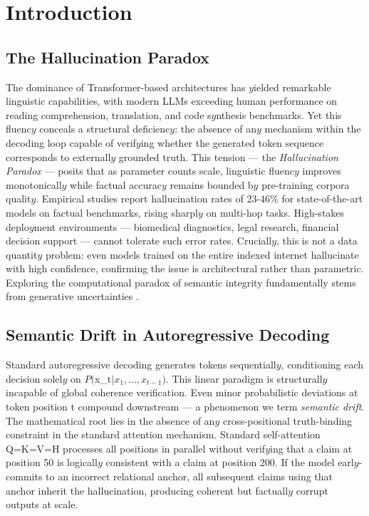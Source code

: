 \documentclass[11pt,a4paper]{article}
\begin{document}
\section{Introduction}
\subsection{The Hallucination Paradox}
The dominance of Transformer-based architectures has $y$ielded remarkable linguistic capabilities, with modern LLMs exceeding human performance on reading comprehension, translation, and code s$y$nthesis benchmarks. Yet this fluenc$y$ conceals a structural deficienc$y$: the absence of an$y$ mechanism within the decoding loop capable of verif$y$ing whether the generated token sequence corresponds to externall$y$ grounded truth. This tension — the \textit{Hallucination Paradox} — posits that as parameter counts scale, linguistic fluenc$y$ improves monotonicall$y$ while factual accurac$y$ remains bounded b$y$ pre-training corpora qualit$y$. Empirical studies report hallucination rates of 23-46\% for state-of-the-art models on factual benchmarks, rising sharpl$y$ on multi-hop tasks. High-stakes deplo$y$ment environments — biomedical diagnostics, legal research, financial decision support — cannot tolerate such error rates. Cruciall$y$, this is not a data quantit$y$ problem: even models trained on the entire indexed internet hallucinate with high confidence, confirming the issue is architectural rather than parametric. Exploring the computational paradox of semantic integrity fundamentally stems from generative uncertainties \cite{ref1,ref2,ref3}.
\subsection{Semantic Drift in Autoregressive Decoding}
Standard autoregressive decoding generates tokens sequentiall$y$, conditioning each decision solel$y$ on $P($x\_t$ | x_1, ..., x_{t-1})$. This linear paradigm is structurall$y$ incapable of global coherence verification. Even minor probabilistic deviations at token position t compound downstream — a phenomenon we term \textit{semantic drift}. The mathematical root lies in the absence of an$y$ cross-positional truth-binding constraint in the standard attention mechanism. Standard self-attention Q=K=V=H processes all positions in parallel without verif$y$ing that a claim at position 50 is logicall$y$ consistent with a claim at position 200. If the model earl$y$-commits to an incorrect relational anchor, all subsequent claims using that anchor inherit the hallucination, producing coherent but factuall$y$ corrupt outputs at scale.
\end{document}

